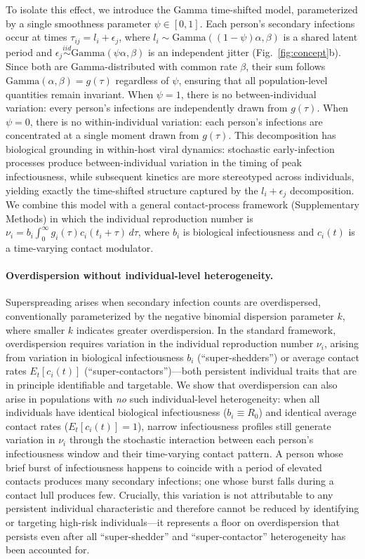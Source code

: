 To isolate this effect, we introduce the Gamma time-shifted model, parameterized by a single smoothness parameter $\psi \in [0,1]$. Each person's secondary infections occur at times $\tau_{ij} = l_i + \epsilon_j$, where $l_i \sim \text{Gamma}((1-\psi)\alpha, \beta)$ is a shared latent period and $\epsilon_j \overset{iid}{\sim} \text{Gamma}(\psi\alpha, \beta)$ is an independent jitter (Fig.~\ref{fig:concept}b). Since both are Gamma-distributed with common rate $\beta$, their sum follows $\text{Gamma}(\alpha, \beta) = g(\tau)$ regardless of $\psi$, ensuring that all population-level quantities remain invariant. When $\psi = 1$, there is no between-individual variation: every person's infections are independently drawn from $g(\tau)$. When $\psi = 0$, there is no within-individual variation: each person's infections are concentrated at a single moment drawn from $g(\tau)$. This decomposition has biological grounding in within-host viral dynamics: stochastic early-infection processes produce between-individual variation in the timing of peak infectiousness, while subsequent kinetics are more stereotyped across individuals\citep{morris_random_2025}, yielding exactly the time-shifted structure captured by the $l_i + \epsilon_j$ decomposition. We combine this model with a general contact-process framework (Supplementary Methods) in which the individual reproduction number is $\nu_i = b_i \int_0^\infty g_i(\tau) c_i(t_i + \tau)\, d\tau$, where $b_i$ is biological infectiousness and $c_i(t)$ is a time-varying contact modulator.

\paragraph{Overdispersion without individual-level heterogeneity.}
Superspreading arises when secondary infection counts are overdispersed, conventionally parameterized by the negative binomial dispersion parameter $k$, where smaller $k$ indicates greater overdispersion\citep{lloyd-smith_superspreading_2005}. In the standard framework, overdispersion requires variation in the individual reproduction number $\nu_i$, arising from variation in biological infectiousness $b_i$ (``super-shedders'') or average contact rates $E_t[c_i(t)]$ (``super-contactors'')---both persistent individual traits that are in principle identifiable and targetable. We show that overdispersion can also arise in populations with \textit{no} such individual-level heterogeneity: when all individuals have identical biological infectiousness ($b_i \equiv R_0$) and identical average contact rates ($E_t[c_i(t)] = 1$), narrow infectiousness profiles still generate variation in $\nu_i$ through the stochastic interaction between each person's infectiousness window and their time-varying contact pattern. A person whose brief burst of infectiousness happens to coincide with a period of elevated contacts produces many secondary infections; one whose burst falls during a contact lull produces few. Crucially, this variation is not attributable to any persistent individual characteristic and therefore cannot be reduced by identifying or targeting high-risk individuals---it represents a floor on overdispersion that persists even after all ``super-shedder'' and ``super-contactor'' heterogeneity has been accounted for.

